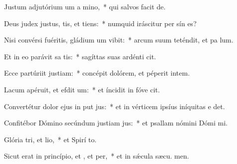\item Justum adjutórium um a mino,~* qui salvos facit  de.
\item Deus judex justus, tis, et tiens:~* numquid iráscitur per sín es?
\item Nisi convérsi fuéritis, gládium um vibit:~* arcum suum teténdit, et pa lum.
\item Et in eo parávit sa tis:~* sagíttas suas ardénti cit.
\item Ecce partúriit justiam:~* concépit dolórem, et péperit intem.
\item Lacum apéruit, et efdit um:~* et íncidit in fóve  cit.
\item Convertétur dolor ejus in put jus:~* et in vérticem ipsíus iníquitas e det.
\item Confitébor Dómino secúndum justiam jus:~* et psallam nómini Dómi mi.
\item Glória tri, et lio,~* et Spirí to.
\item Sicut erat in princípio, et , et per,~* et in sǽcula sæcu. men.
